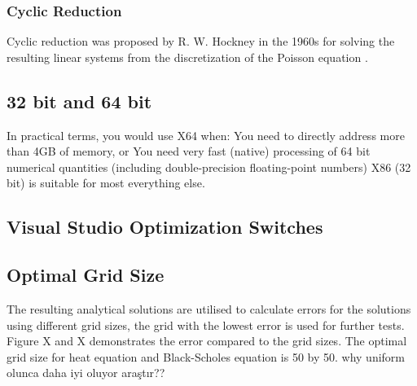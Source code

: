 \documentclass[12pt, oneside]{book}
\theoremstyle{plain}
\theoremstyle{definition}
\begin{document}
 \subsubsection{Cyclic Reduction}
Cyclic reduction was proposed by R. W. Hockney in the 1960s for solving the resulting linear systems from the  discretization of the Poisson equation \cite{Hockney}. 

\subsection{32 bit and 64 bit}
In practical terms, you would use X64 when:  You need to directly address more than 4GB of memory, or   You need very fast (native) processing of 64 bit numerical quantities (including double-precision floating-point numbers) X86 (32 bit) is suitable for most everything else.
    
\subsection{Visual Studio Optimization Switches}


\subsection{Optimal Grid Size}
The resulting analytical solutions are utilised to calculate errors for the solutions using different grid sizes, the grid with the lowest error is used for further tests. Figure X and X demonstrates the error compared to the grid sizes. The optimal grid size for heat equation and Black-Scholes equation is 50 by 50. why uniform olunca daha iyi oluyor araştır??
\end{document}
